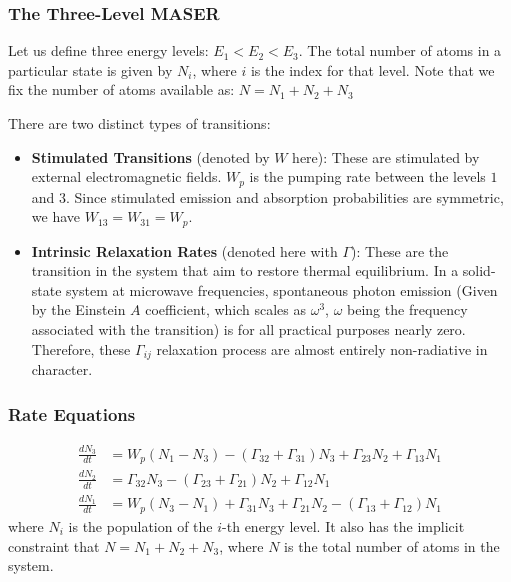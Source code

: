 \documentclass{beamer}
\begin{document}
    \begin{frame}
        \frametitle{The Three-Level MASER}
        Let us define three energy levels: $E_{1}<E_{2}<E_{3}$. The total number of atoms in a particular state is given by $N_{i}$, where $i$ is the index for that level. Note that we fix the number of atoms available as:
        $
        N = N_{1}+N_{2}+N_{3}
        $

        There are two distinct types of transitions:
        \begin{itemize}
            \item  \textbf{Stimulated Transitions} (denoted by $W$ here): These are stimulated by external electromagnetic fields. $W_{p}$ is the pumping rate between the levels $1$ and $3$. Since stimulated emission and absorption probabilities are symmetric, we have $W_{13} = W_{31} = W_{p}$. 
            \item  \textbf{Intrinsic Relaxation Rates} (denoted here with $\Gamma$): These are the transition in the system that aim to restore thermal equilibrium. In a solid-state system at microwave frequencies, spontaneous photon emission (Given by the Einstein $A$ coefficient, which scales as $\omega^3$, $\omega$ being the frequency associated with the transition) is for all practical purposes nearly zero. Therefore, these $\Gamma_{ij}$ relaxation process are almost entirely non-radiative in character.
        \end{itemize}

        \end{frame}
    \begin{frame}
        \frametitle{Rate Equations}
               
        \begin{tcolorbox}[colback=red!5!white,colframe=red!75!black,title= Rate Equations]
        \begin{align}
            \frac{dN_{3}}{dt} &=  W_{p}(N_{1} - N_{3}) - (\Gamma_{32} + \Gamma_{31}) N_{3} + \Gamma_{23}N_{2} + \Gamma_{13}N_{1}\\
            \frac{dN_{2}}{dt} &= \Gamma_{32}N_{3} - (\Gamma_{23}+\Gamma_{21})N_{2}+\Gamma_{12}N_{1} \\
            \frac{dN_{1}}{dt} &= W_{p}(N_{3}-N_{1})+\Gamma_{31}N_{3}+\Gamma_{21}N_{2}-(\Gamma_{13}+\Gamma_{12})N_{1}
        \end{align}
        where $N_{i}$ is the population of the $i$-th energy level. It also has the implicit constraint that $N = N_{1}+N_{2}+N_{3}$, where $N$ is the total number of atoms in the system.
        \end{tcolorbox}
        \end{frame}
\end{document}
